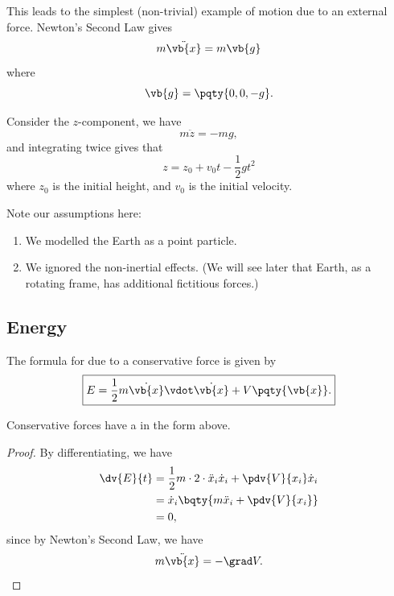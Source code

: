 This leads to the simplest (non-trivial) example of motion due to an external force. Newton's Second Law gives
\begin{equation}
    m \ddot{\vb{x}} = m \vb{g}
\end{equation}
where
\begin{equation}
    \vb{g} = \pqty{0, 0, -g}.
\end{equation}

Consider the \(z\)-component, we have
\begin{equation}
    m\ddot{z} = -mg,
\end{equation}
and integrating twice gives that
\begin{equation}
    z = z_0 + v_0 t - \frac{1}{2} g t^2
\end{equation}
where \(z_0\) is the initial height, and \(v_0\) is the initial velocity.

Note our assumptions here:
\begin{enumerate}
    \item We modelled the Earth as a point particle.
    \item We ignored the non-inertial effects. (We will see later that Earth, as a rotating frame, has additional fictitious forces.)
\end{enumerate}

\subsection{Energy}

\begin{definition}
    \label{def:energy-conservative-force}%
    The formula for  due to a conservative force is given by
    \begin{equation}
        \boxed{E = \frac{1}{2} m \dot{\vb{x}} \vdot \dot{\vb{x}} + V\pqty{\vb{x}}.}
    \end{equation}
\end{definition}

\begin{proposition}
    \label{prop:conservative-forces-conserved-energy}%
    Conservative forces have a  in the form above.
\end{proposition}

\begin{proof}
    By differentiating, we have
    \begin{subequations}\begin{align}
        \dv{E}{t} &= \frac{1}{2} m \cdot 2 \cdot \ddot{x}_i \dot{x}_i + \pdv{V}{x_i} \dot{x}_i \\
        &= \dot{x}_i \bqty{m \ddot{x}_i + \pdv{V}{x_i}} \\
        &= 0,
    \end{align}\end{subequations}
    since by Newton's Second Law, we have
    \begin{equation}
        m \ddot{\vb{x}} = - \grad V.
    \end{equation}
\end{proof}

